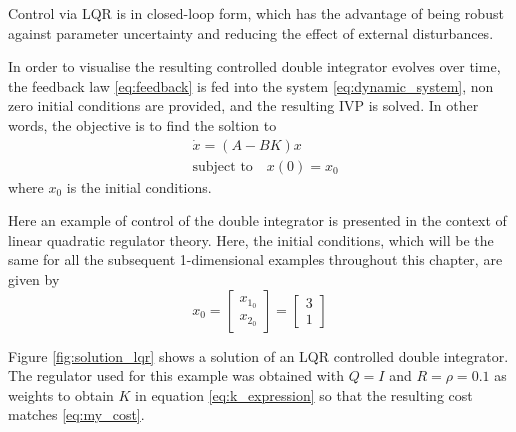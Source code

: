 \par Control via LQR is in closed-loop form, which has the advantage of being robust against parameter uncertainty and reducing the effect of external disturbances. 
\par In order to visualise the resulting controlled double integrator evolves over time, the feedback law \eqref{eq:feedback} is fed into the system \eqref{eq:dynamic_system}, non zero initial conditions are provided, and the resulting \ac{IVP} is solved. In other words, the objective is to find the soltion to 
\begin{equation}
    \begin{aligned}
    & \dot{x} = (A-BK)x \\
    & \text{subject to} \quad x(0) = x_0
    \end{aligned}
    \label{eq:controlledlinearsystem}
\end{equation}
where $x_0$ is the initial conditions.



\par Here an example of control of the double integrator is presented in the context of linear quadratic regulator theory. Here, the initial conditions, which will be the same for all the subsequent 1-dimensional examples throughout this chapter, are  given by
\begin{equation}
    \label{eq:initial_conds}
    x_0 = \begin{bmatrix} x_{1_0} \\ x_{2_0} \end{bmatrix} = \begin{bmatrix} 3 \\ 1 \end{bmatrix}
\end{equation}

\par Figure \ref{fig:solution_lqr} shows a solution of an LQR controlled double integrator. The regulator used for this example was obtained with $Q = I$ and $R = \rho = 0.1$ as weights to obtain $K$ in equation \ref{eq:k_expression} so that the resulting cost matches \ref{eq:my_cost}.



